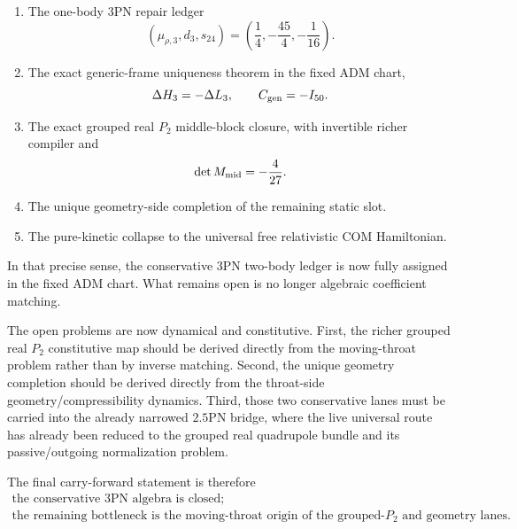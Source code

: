 \documentclass[11pt]{article}
\begin{document}
\begin{enumerate}
    \item The one-body $3$PN repair ledger
    \[
    (\mu_{\rho,3},d_3,s_{24})=
    \left(\frac14,-\frac{45}{4},-\frac1{16}\right).
    \]
    \item The exact generic-frame uniqueness theorem in the fixed ADM chart,
    \[
    \Delta H_3=-\Delta L_3,
    \qquad
    C_{\rm gen}=-I_{50}.
    \]
    \item The exact grouped real $P_2$ middle-block closure, with invertible richer compiler and
    \[
    \det M_{\rm mid}=-\frac4{27}.
    \]
    \item The unique geometry-side completion of the remaining static slot.
    \item The pure-kinetic collapse to the universal free relativistic COM Hamiltonian.
\end{enumerate}

In that precise sense, the conservative $3$PN two-body ledger is now fully assigned in the fixed ADM chart. What remains open is no longer algebraic coefficient matching.

The open problems are now dynamical and constitutive. First, the richer grouped real $P_2$ constitutive map should be derived directly from the moving-throat problem rather than by inverse matching. Second, the unique geometry completion should be derived directly from the throat-side geometry/compressibility dynamics. Third, those two conservative lanes must be carried into the already narrowed $2.5$PN bridge, where the live universal route has already been reduced to the grouped real quadrupole bundle and its passive/outgoing normalization problem.

The final carry-forward statement is therefore
\[
\boxed{
\begin{gathered}
\text{the conservative $3$PN algebra is closed;}\\
\text{the remaining bottleneck is the moving-throat origin of the grouped-}P_2\text{ and geometry lanes.}
\end{gathered}
}
\]
\end{document}
